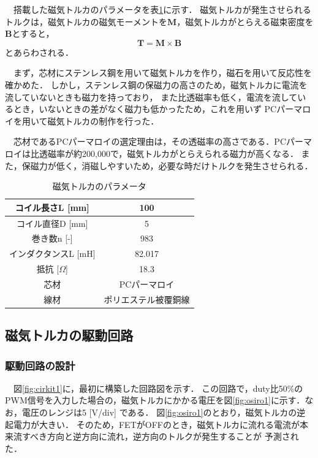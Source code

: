 　搭載した磁気トルカのパラメータを表\ref{table:torquer}に示す．
磁気トルカが発生させられるトルクは，磁気トルカの磁気モーメントを$\boldsymbol{M}$，磁気トルカがとらえる磁束密度を$\boldsymbol{B}$とすると，
\begin{equation}
	\boldsymbol{T = M \times B}
\end{equation}
とあらわされる．

　まず，芯材にステンレス鋼を用いて磁気トルカを作り，磁石を用いて反応性を確かめた．
しかし，ステンレス鋼の保磁力の高さのため，磁気トルカに電流を流していないときも磁力を持っており，
また比透磁率も低く，電流を流しているとき，いないときの差がなく磁力も低かったため，これを用いず
PCパーマロイを用いて磁気トルカの制作を行った．

　芯材であるPCパーマロイの選定理由は，その透磁率の高さである．PCパーマロイは比透磁率が約200,000で，磁気トルカがとらえられる磁力が高くなる．
また，保磁力が低く，消磁しやすいため，必要な時だけトルクを発生させられる．


\begin{table}[H]
	\centering
	\caption{磁気トルカのパラメータ}
	\label{table:torquer}
	\begin{tabular}{|c||c|}
		\hline
		コイル長さL [mm] & 100\\ \hline
		コイル直径D [mm] & 5\\ \hline
		巻き数n [-] & 983 \\ \hline
		インダクタンスL [mH] & 	82.017 \\ \hline
		抵抗 [$\Omega $] & 18.3 \\ \hline
		芯材 & PCパーマロイ \\ \hline
		線材 & ポリエステル被覆銅線 \\ \hline    
	\end{tabular}
\end{table}


\subsection{磁気トルカの駆動回路}
\subsubsection{駆動回路の設計}
　図\ref{fig:cirkit1}に，最初に構築した回路図を示す．
この回路で，duty比50\%のPWM信号を入力した場合の，磁気トルカにかかる電圧を図\ref{fig:osiro1}に示す．なお，電圧のレンジは5 [V/div] である．
図\ref{fig:osiro1}のとおり，磁気トルカの逆起電力が大きい．
そのため，FETがOFFのとき，磁気トルカに流れる電流が本来流すべき方向と逆方向に流れ，逆方向のトルクが発生することが
予測された．

